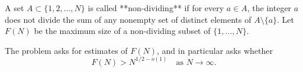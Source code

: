 A set $A\subset\{1,2,\dots,N\}$ is called **non-dividing** if for every $a\in A$, the integer $a$ does not divide the sum of any nonempty set of distinct elements of $A\setminus\{a\}$.
Let $F(N)$ be the maximum size of a non-dividing subset of $\{1,\dots,N\}$.

The problem asks for estimates of $F(N)$, and in particular asks whether
\[
F(N) > N^{1/2-o(1)}\quad\text{as }N\to\infty.
\]
